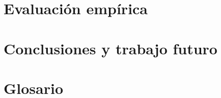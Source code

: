 \documentclass[a4paper, 11pt]{book}
\begin{document}
\begin{sloppypar}
\chapter{Evaluación empírica}\label{chapter:evaluation}


\chapter{Conclusiones y trabajo futuro}\label{chapter:conclusions}


% 

\chapter{Glosario}\label{chapter:glossary}






% 


% 


% 



% 
\end{sloppypar}
\end{document}
